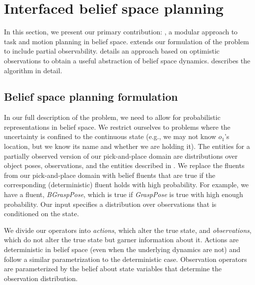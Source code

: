 \section{Interfaced belief space planning}
In this section, we present our primary contribution: \ibsp, a modular
approach to task and motion planning in belief
space.  extends our formulation of the
problem to include partial observability. 
details an approach based on optimistic observations to obtain a
useful abstraction of belief space dynamics.  
describes the \ibsp{} algorithm in detail.


\subsection{Belief space planning formulation}
\label{sec-bsp-formulation}
In our full description of the problem, we need to allow for
probabilistic representations in belief space. We restrict ourselves
to problems where the uncertainty is confined to the continuous state
(e.g., we may not know $o_1$'s location, but we know its name and
whether we are holding it). The entities for a partially observed
version of our pick-and-place domain are distributions over object poses,
observations, and the entities described in
. We replace the fluents from our pick-and-place
domain with belief fluents that are true if the corresponding
(deterministic) fluent holds with high probability. For example,
we have a fluent, \emph{BGraspPose}, which is true if \emph{GraspPose}
is true with high enough probability. Our input specifies a
distribution over observations that is conditioned on the state.

We divide our operators into \emph{actions}, which alter the true
state, and \emph{observations}, which do not alter the true state but
garner information about it. Actions are deterministic in belief space
(even when the underlying dynamics are not) and follow a similar
parametrization to the deterministic case. Observation operators are
parameterized by the belief about state variables that determine the
observation distribution.

